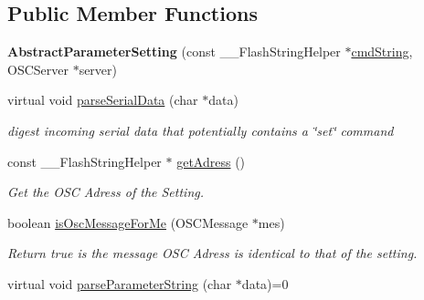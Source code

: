 \subsection*{Public Member Functions}
\begin{DoxyCompactItemize}
\item 
\hypertarget{class_abstract_parameter_setting_aa4519e15a2b44c4c7031d0d704f7afbb}{{\bfseries Abstract\-Parameter\-Setting} (const \-\_\-\-\_\-\-Flash\-String\-Helper $\ast$\hyperlink{class_abstract_parameter_setting_a038edb8c34265166b4d7927cf0ee2776}{cmd\-String}, O\-S\-C\-Server $\ast$server)}\label{class_abstract_parameter_setting_aa4519e15a2b44c4c7031d0d704f7afbb}

\item 
\hypertarget{class_abstract_parameter_setting_a50b8a828fb479f1a56dd484d384f3004}{virtual void \hyperlink{class_abstract_parameter_setting_a50b8a828fb479f1a56dd484d384f3004}{parse\-Serial\-Data} (char $\ast$data)}\label{class_abstract_parameter_setting_a50b8a828fb479f1a56dd484d384f3004}

\begin{DoxyCompactList}\small\item\em digest incoming serial data that potentially contains a \char`\"{}set\char`\"{} command \end{DoxyCompactList}\item 
\hypertarget{class_abstract_parameter_setting_a186b590b0138e1c9aa1c92d9d44b4eaf}{const \-\_\-\-\_\-\-Flash\-String\-Helper $\ast$ \hyperlink{class_abstract_parameter_setting_a186b590b0138e1c9aa1c92d9d44b4eaf}{get\-Adress} ()}\label{class_abstract_parameter_setting_a186b590b0138e1c9aa1c92d9d44b4eaf}

\begin{DoxyCompactList}\small\item\em Get the O\-S\-C Adress of the Setting. \end{DoxyCompactList}\item 
\hypertarget{class_abstract_parameter_setting_ad246c7882fefad26896f76056cbd505c}{boolean \hyperlink{class_abstract_parameter_setting_ad246c7882fefad26896f76056cbd505c}{is\-Osc\-Message\-For\-Me} (O\-S\-C\-Message $\ast$mes)}\label{class_abstract_parameter_setting_ad246c7882fefad26896f76056cbd505c}

\begin{DoxyCompactList}\small\item\em Return true is the message O\-S\-C Adress is identical to that of the setting. \end{DoxyCompactList}\item 
\hypertarget{class_abstract_parameter_setting_a6a6fab01d83ea32719b419e3d843e716}{virtual void \hyperlink{class_abstract_parameter_setting_a6a6fab01d83ea32719b419e3d843e716}{parse\-Parameter\-String} (char $\ast$data)=0}\label{class_abstract_parameter_setting_a6a6fab01d83ea32719b419e3d843e716}


\end{DoxyCompactItemize}
